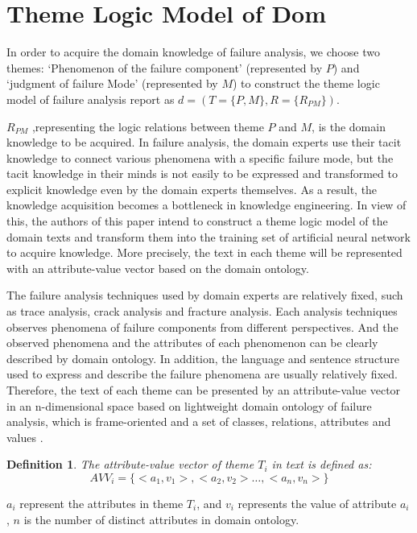 \documentclass{elsarticle}
\newtheorem{definition}{Definition}
\begin{document}
\section{Theme Logic Model of Dom
}
\label{sec:theme-logic-model}

In order to acquire the domain knowledge of failure analysis, we
choose two themes: ‘Phenomenon of the failure component’ (represented
by $P$) and ‘judgment of failure Mode’ (represented by $M$) to construct
the theme logic model of failure analysis report as $d = (T = \{P,M\},
R = \{R_{PM}\})$.

$R_{PM}$ ,representing the logic relations between theme $P$ and $M$, is the domain knowledge to be acquired. In failure analysis, the
domain experts use their tacit knowledge to connect various phenomena
with a specific failure mode, but the tacit knowledge in their minds is
not easily to be expressed and transformed to explicit knowledge even
by the domain experts themselves. As a result, the
knowledge acquisition becomes a bottleneck in knowledge
engineering. In view of this, the authors of this paper intend to construct a theme logic model of the domain
texts and transform them into the training set of artificial neural
network to acquire knowledge. More precisely, the text in each
theme will be represented with an attribute-value vector based on the
domain ontology. 

The failure analysis techniques used by domain experts are relatively
fixed, such as trace analysis, crack analysis and fracture
analysis. Each analysis techniques observes phenomena of failure
components from different perspectives. And the observed phenomena and
the attributes of each phenomenon can be clearly described by domain
ontology. In addition, the language and sentence structure used to express and describe the failure phenomena are usually relatively fixed. Therefore, the text of each theme can be presented by an attribute-value vector in an n-dimensional space based on lightweight domain ontology of failure analysis, which is frame-oriented and a set of classes, relations, attributes and values \cite{747902}.

\begin{definition}
  The attribute-value vector of theme $T_i$ in text is defined as:
\[AVV_i = \{<a_1,v_1>,<a_2,v_2> \ldots,<a_n,v_n>\} \]
\end{definition}
$a_i$ represent the attributes in theme $T_i$, and $v_i$ represents the value of attribute $a_i$ , $n$ is the number of distinct attributes in domain ontology.
\end{document}
